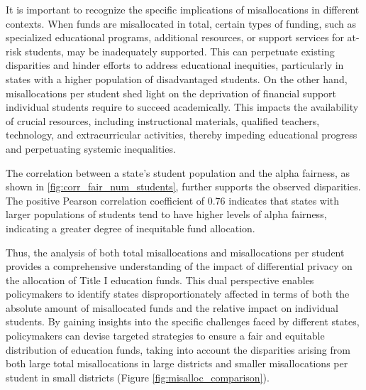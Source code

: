 It is important to recognize the specific implications of misallocations in different contexts. When funds are
misallocated in total, certain types of funding, such as specialized educational programs, additional resources, or
support services for at-risk students, may be inadequately supported. This can perpetuate existing disparities and
hinder efforts to address educational inequities, particularly in states with a higher population of disadvantaged
students. On the other hand, misallocations per student shed light on the deprivation of financial support
individual students require to succeed academically. This impacts the availability of crucial resources, including
instructional materials, qualified teachers, technology, and extracurricular activities, thereby impeding
educational progress and perpetuating systemic inequalities.

The correlation between a state's student population and the alpha fairness, as shown in
\ref{fig:corr_fair_num_students}, further supports the observed disparities. The positive Pearson correlation coefficient of
0.76 indicates that states with larger populations of students tend to have higher levels of alpha fairness,
indicating a greater degree of inequitable fund allocation.

Thus, the analysis of both total misallocations and misallocations per student provides a comprehensive understanding
of the impact of differential privacy on the allocation of Title I education funds. This dual perspective enables
policymakers to identify states disproportionately affected in terms of both the absolute amount of misallocated
funds and the relative impact on individual students. By gaining insights into the specific challenges faced by
different states, policymakers can devise targeted strategies to ensure a fair and equitable distribution of
education funds, taking into account the disparities arising from both large total misallocations in large districts
and smaller misallocations per student in small districts (Figure \ref{fig:misalloc_comparison}).
